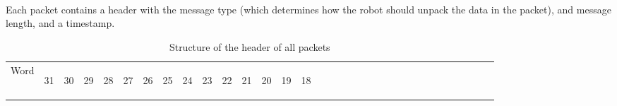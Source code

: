 \documentclass[11pt]{article}
\begin{document}
\paragraph{}
Each packet contains a header with the message type (which determines how the robot should unpack the data in the packet),
and message length, and a timestamp.
\newline
\begin{table}[h!]
    \centering
    \caption{Structure of the header of all packets}
    \label{tab:headerDef}
    \begin{tabular}{|p{1cm}|m{0.04cm}|m{0.04cm}|m{0.04cm}|m{0.04cm}|m{0.04cm}|m{0.04cm}|m{0.04cm}|m{0.04cm}|m{0.04cm}|
        m{0.04cm}|m{0.04cm}|m{0.04cm}|m{0.04cm}|m{0.04cm}|m{0.04cm}|m{0.04cm}|m{0.04cm}|m{0.04cm}|m{0.04cm}|m{0.04cm}|
        m{0.04cm}|m{0.04cm}|m{0.04cm}|m{0.04cm}|m{0.04cm}|m{0.04cm}|m{0.04cm}|m{0.04cm}|m{0.04cm}|m{0.04cm}|m{0.04cm}|m{0.04cm}|}
        \hline
        Word & 
        \begin{sideways}31\end{sideways} &
        \begin{sideways}30\end{sideways} & 
        \begin{sideways}29\end{sideways} &
        \begin{sideways}28\end{sideways} &
        \begin{sideways}27\end{sideways} &
        \begin{sideways}26\end{sideways} &
        \begin{sideways}25\end{sideways} &
        \begin{sideways}24\end{sideways} &
        \begin{sideways}23\end{sideways} &
        \begin{sideways}22\end{sideways} &
        \begin{sideways}21\end{sideways} &
        \begin{sideways}20\end{sideways} &
        \begin{sideways}19\end{sideways} &
        \begin{sideways}18\end{sideways} &

\end{tabular}
\end{table}
\end{document}
